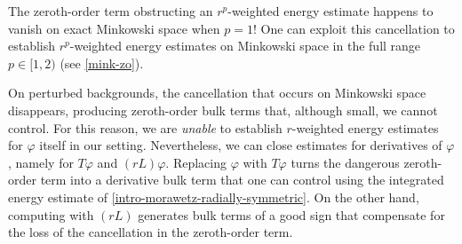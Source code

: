 \documentclass[10pt, reqno]{amsart}
\begin{document}
The zeroth-order term obstructing an \(r^p\)-weighted energy estimate happens to
vanish on exact Minkowski space when \(p = 1\)! One can exploit this
cancellation to establish \(r^p\)-weighted energy estimates on Minkowski space
in the full range \(p\in [1,2)\) (see \cref{mink-zo}).

On perturbed backgrounds, the cancellation that occurs on Minkowski space
disappears, producing zeroth-order bulk terms that, although small, we cannot
control. For this reason, we are \emph{unable} to establish \(r\)-weighted energy
estimates for \(\varphi{}\) itself in our setting. Nevertheless, we can close
estimates for derivatives of \(\varphi{}\), namely for \(T\varphi{}\) and
\((rL)\varphi{}\). Replacing \(\varphi{}\) with \(T\varphi{}\) turns the
dangerous zeroth-order term into a derivative bulk term that one can control
using the integrated energy estimate of \cref{intro-morawetz-radially-symmetric}.
On the other hand, computing with \((rL)\) generates bulk terms of a good sign
that compensate for the loss of the cancellation in the zeroth-order term.
\end{document}
